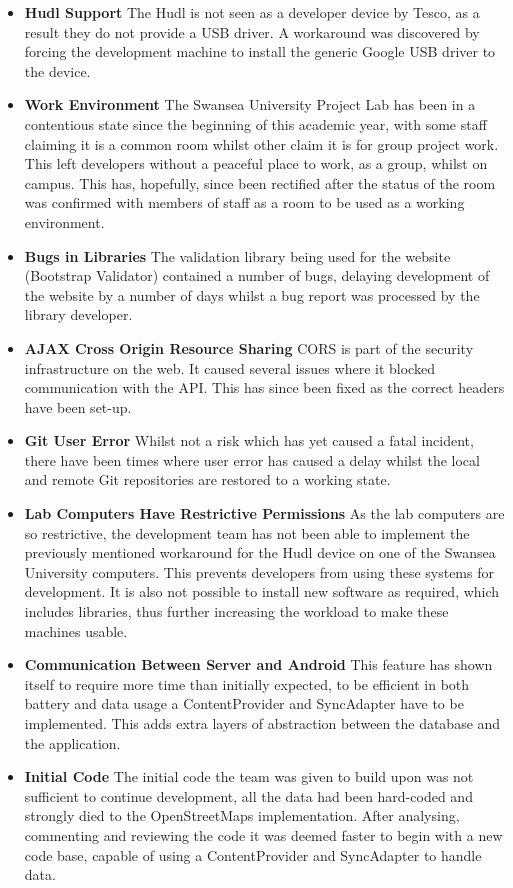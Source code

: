 \documentclass[11pt,a4paper]{article}
\begin{document}
\begin{itemize}
\item\textbf{Hudl Support} The Hudl is not seen as a developer device by Tesco, as a result they do not provide a USB driver. A workaround was discovered by forcing the development machine to install the generic Google USB driver to the device.
\item\textbf{Work Environment} The Swansea University Project Lab has been in a contentious state since the beginning of this academic year, with some staff claiming it is a common room whilst other claim it is for group project work. This left developers without a peaceful place to work, as a group, whilst on campus. This has, hopefully, since been rectified after the status of the room was confirmed with members of staff as a room to be used as a working environment.
\item\textbf{Bugs in Libraries} The validation library being used for the website (Bootstrap Validator\cite{bootstrapValidator}) contained a number of bugs, delaying development of the website by a number of days whilst a bug report was processed by the library developer.
\item\textbf{AJAX Cross Origin Resource Sharing} CORS is part of the security infrastructure on the web. It caused several issues where it blocked communication with the API. This has since been fixed as the correct headers have been set-up.
\item\textbf{Git User Error} Whilst not a risk which has yet caused a fatal incident, there have been times where user error has caused a delay whilst the local and remote Git repositories are restored to a working state.
\item\textbf{Lab Computers Have Restrictive Permissions} As the lab computers are so restrictive, the development team has not been able to implement the previously mentioned workaround for the Hudl device on one of the Swansea University computers. This prevents developers from using these systems for development. It is also not possible to install new software as required, which includes libraries, thus further increasing the workload to make these machines usable.
\item\textbf{Communication Between Server and Android} This feature has shown itself to require more time than initially expected, to be efficient in both battery and data usage a ContentProvider and SyncAdapter have to be implemented. This adds extra layers of abstraction between the database and the application.
\item\textbf{Initial Code} The initial code the team was given to build upon was not sufficient to continue development, all the data had been hard-coded and strongly died to the OpenStreetMaps implementation. After analysing, commenting and reviewing the code it was deemed faster to begin with a new code base, capable of using a ContentProvider and SyncAdapter to handle data.
\end{itemize}
\end{document}
